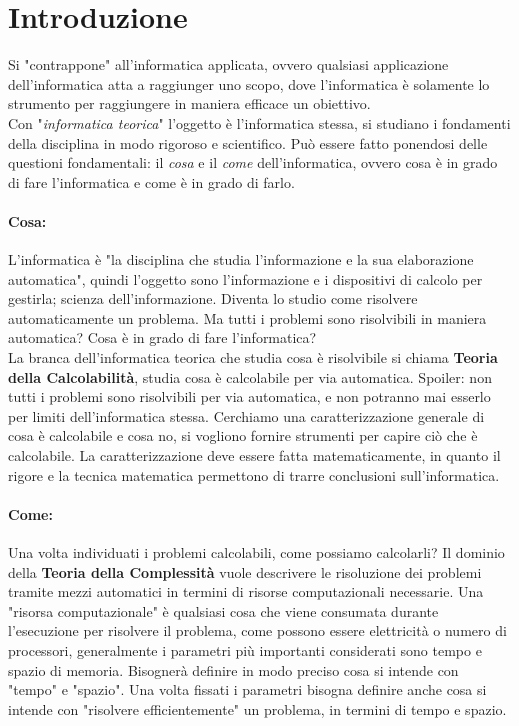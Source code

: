 \section{Introduzione}

Si "contrappone" all'informatica applicata, ovvero qualsiasi applicazione dell'informatica atta a raggiunger uno scopo, dove l'informatica è solamente lo strumento per raggiungere in maniera efficace un obiettivo.\\
Con "\textit{informatica teorica}" l'oggetto è l'informatica stessa, si studiano i fondamenti della disciplina in modo rigoroso e scientifico. Può essere fatto ponendosi delle questioni fondamentali: il \textit{cosa} e il \textit{come} dell'informatica, ovvero cosa è in grado di fare l'informatica e come è in grado di farlo.

\paragraph{Cosa:} L'informatica è "la disciplina che studia l'informazione e la sua elaborazione automatica", quindi l'oggetto sono l'informazione e i dispositivi di calcolo per gestirla; scienza dell'informazione. Diventa lo studio come risolvere automaticamente un problema. Ma tutti i problemi sono risolvibili in maniera automatica? Cosa è in grado di fare l'informatica? \\

La branca dell'informatica teorica che studia cosa è risolvibile si chiama \textbf{Teoria della Calcolabilità}, studia cosa è calcolabile per via automatica. Spoiler: non tutti i problemi sono risolvibili per via automatica, e non potranno mai esserlo per limiti dell'informatica stessa. Cerchiamo una caratterizzazione generale di cosa è calcolabile e cosa no, si vogliono fornire strumenti per capire ciò che è calcolabile. La caratterizzazione deve essere fatta matematicamente, in quanto il rigore e la tecnica matematica permettono di trarre conclusioni sull'informatica.

\paragraph{Come:} Una volta individuati i problemi calcolabili, come possiamo calcolarli? Il dominio della \textbf{Teoria della Complessità} vuole descrivere le risoluzione dei problemi tramite mezzi automatici in termini di risorse computazionali necessarie. Una "risorsa computazionale" è qualsiasi cosa che viene consumata durante l'esecuzione per risolvere il problema, come possono essere elettricità o numero di processori, generalmente i parametri più importanti considerati sono tempo e spazio di memoria. Bisognerà definire in modo preciso cosa si intende con "tempo" e "spazio". Una volta fissati i parametri bisogna definire anche cosa si intende con "risolvere efficientemente" un problema, in termini di tempo e spazio.\\

